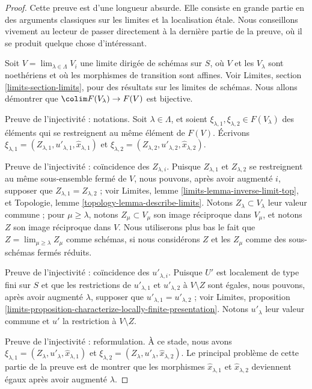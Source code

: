 \begin{proof}
Cette preuve est d'une longueur absurde. Elle consiste en grande partie en des
arguments classiques sur les limites et la localisation \'etale. Nous
conseillons vivement au lecteur de passer directement à la dernière partie de
la preuve, où il se produit quelque chose d'intéressant.

\medskip\noindent
Soit $V = \lim_{\lambda \in \Lambda} V_i$ une limite dirigée de schémas sur
$S$, où $V$ et les $V_\lambda$ sont noethériens et où les morphismes de
transition sont affines. Voir Limites, section \ref{limits-section-limits},
pour des résultats sur les limites de schémas. Nous allons démontrer que
$\colim F(V_\lambda) \to F(V)$ est bijective.

\medskip\noindent
Preuve de l'injectivité : notations.
Soit $\lambda \in \Lambda$, et soient
$\xi_{\lambda, 1}, \xi_{\lambda, 2} \in F(V_\lambda)$ des éléments qui se
restreignent au même élément de $F(V)$. Écrivons
$\xi_{\lambda, 1} = (Z_{\lambda, 1}, u'_{\lambda, 1},
\hat x_{\lambda, 1})$ et
$\xi_{\lambda, 2} = (Z_{\lambda, 2}, u'_{\lambda, 2}, \hat x_{\lambda, 2})$.

\medskip\noindent
Preuve de l'injectivité : coïncidence des $Z_{\lambda, i}$.
Puisque $Z_{\lambda, 1}$ et $Z_{\lambda, 2}$ se restreignent au même
sous-ensemble fermé de $V$, nous pouvons, après avoir augmenté $i$, supposer
que $Z_{\lambda, 1} = Z_{\lambda, 2}$ ; voir Limites, lemme
\ref{limits-lemma-inverse-limit-top}, et Topologie, lemme
\ref{topology-lemma-describe-limits}. Notons $Z_\lambda \subset V_\lambda$
leur valeur commune ; pour $\mu \geq \lambda$, notons
$Z_\mu \subset V_\mu$ son image réciproque dans $V_\mu$, et notons $Z$ son
image réciproque dans $V$. Nous utiliserons plus bas le fait que
$Z = \lim_{\mu \geq \lambda} Z_\mu$ comme schémas, si nous considérons $Z$ et
les $Z_\mu$ comme des sous-schémas fermés réduits.

\medskip\noindent
Preuve de l'injectivité : coïncidence des $u'_{\lambda, i}$.
Puisque $U'$ est localement de type fini sur $S$ et que les restrictions de
$u'_{\lambda, 1}$ et $u'_{\lambda, 2}$ à $V \setminus Z$ sont égales, nous
pouvons, après avoir augmenté $\lambda$, supposer que
$u'_{\lambda, 1} = u'_{\lambda, 2}$ ; voir Limites, proposition
\ref{limits-proposition-characterize-locally-finite-presentation}. Notons
$u'_\lambda$ leur valeur commune et $u'$ la restriction à $V \setminus Z$.

\medskip\noindent
Preuve de l'injectivité : reformulation.
À ce stade, nous avons
$\xi_{\lambda, 1} = (Z_\lambda, u'_\lambda, \hat x_{\lambda, 1})$ et
$\xi_{\lambda, 2} = (Z_\lambda, u'_\lambda, \hat x_{\lambda, 2})$.
Le principal problème de cette partie de la preuve est de montrer que les
morphismes $\hat x_{\lambda, 1}$ et $\hat x_{\lambda, 2}$ deviennent égaux
après avoir augmenté $\lambda$.


\end{proof}
